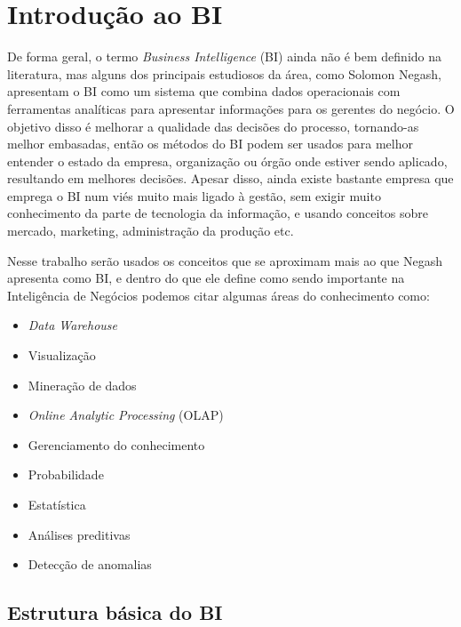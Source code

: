 \chapter{Introdução ao BI}\label{cap_trabalho_academico}


De forma geral, o termo \textit{Business Intelligence} (BI) ainda não é bem definido na literatura, mas alguns dos principais estudiosos da área, como Solomon Negash, apresentam o BI como um sistema que combina dados operacionais com ferramentas analíticas para apresentar informações para os gerentes do negócio. O objetivo disso é melhorar a qualidade das decisões do processo, tornando-as melhor embasadas, então os métodos do BI podem ser usados para melhor entender o estado da empresa, organização ou órgão onde estiver sendo aplicado, resultando em melhores decisões. Apesar disso, ainda existe bastante empresa que emprega o BI num viés muito mais ligado à gestão, sem exigir muito conhecimento da parte de tecnologia da informação, e usando conceitos sobre mercado, marketing, administração da produção etc. 

Nesse trabalho serão usados os conceitos que se aproximam mais ao que Negash apresenta como BI, e dentro do que ele define como sendo importante na Inteligência de Negócios podemos citar algumas áreas do conhecimento como:

\begin{itemize}
	\item \textit{Data Warehouse}
	\item Visualização
	\item Mineração de dados
	\item \textit{Online Analytic Processing} (OLAP)
	\item Gerenciamento do conhecimento
	\item Probabilidade
	\item Estatística
	\item Análises preditivas
	\item Detecção de anomalias
\end{itemize}

\section{Estrutura básica do BI}

